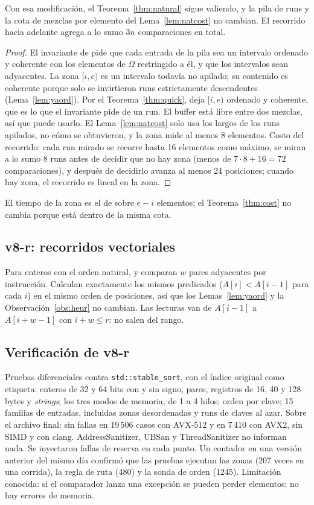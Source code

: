 \begin{lema}[Zonas]\label{lem:zonas}
Con esa modificación, el Teorema~\ref{thm:natural} sigue valiendo, y la pila de runs y
la cota de mezclas por elemento del Lema~\ref{lem:natcost} no cambian. El recorrido
hacia adelante agrega a lo sumo $3n$ comparaciones en total.
\end{lema}
\begin{proof}
El invariante de \Natural pide que cada entrada de la pila sea un intervalo ordenado y
coherente con los elementos de $\Omega$ restringido a él, y que los intervalos sean
adyacentes. La zona $[i,e)$ es un intervalo todavía no apilado; su contenido es
coherente porque solo se invirtieron runs estrictamente descendentes
(Lema~\ref{lem:yaord}). Por el Teorema~\ref{thm:quick}, \Quick deja $[i,e)$ ordenado y
coherente, que es lo que el invariante pide de un run. El buffer está libre entre dos
mezclas, así que \Quick puede usarlo. El Lema~\ref{lem:natcost} solo usa los largos de
los runs apilados, no cómo se obtuvieron, y la zona mide al menos 8 elementos. Costo
del recorrido: cada run mirado se recorre hasta 16 elementos como máximo, se miran a lo
sumo 8 runs antes de decidir que no hay zona (menos de $7\cdot 8+16=72$ comparaciones), y
después de decidirlo \Natural avanza al menos 24 posiciones; cuando hay zona, el
recorrido es lineal en la zona.
\end{proof}

El tiempo de la zona es el de \Quick sobre $e-i$ elementos; el Teorema~\ref{thm:cost}
no cambia porque \Quick está dentro de la misma cota.

\subsection{v8-r: recorridos vectoriales}
Para enteros con el orden natural, \Ordenado y \PocosGiros comparan $w$ pares adyacentes
por instrucción. Calculan exactamente los mismos predicados
($A[i]\lt A[i-1]$ para cada $i$) en el mismo orden de posiciones, así que los
Lemas~\ref{lem:yaord} y la Observación~\ref{obs:heur} no cambian. Las lecturas van de
$A[i-1]$ a $A[i+w-1]$ con $i+w\le r$: no salen del rango.

\subsection{Verificación de v8-r}\label{sec:v8r-pruebas}
Pruebas diferenciales contra \texttt{std::stable\_sort}, con el índice original como
etiqueta: enteros de 32 y 64 bits con y sin signo, pares, registros de 16, 40 y 128
bytes y \emph{strings}; los tres modos de memoria; de 1 a 4 hilos; orden por clave;
15 familias de entradas, incluidas zonas desordenadas y runs de claves al azar. Sobre el
archivo final: sin fallas en 19\,506 casos con AVX-512 y en 7\,410 con AVX2, sin SIMD y
con clang. AddressSanitizer, UBSan y ThreadSanitizer no informan nada. Se inyectaron
fallas de reserva en cada punto. Un contador en una versión anterior del mismo día
confirmó que las pruebas ejecutan las zonas (207 veces en una corrida), la regla de ruta
(480) y la sonda de orden (1245). Limitación conocida: si el
comparador lanza una excepción se pueden perder elementos; no hay errores de memoria.

